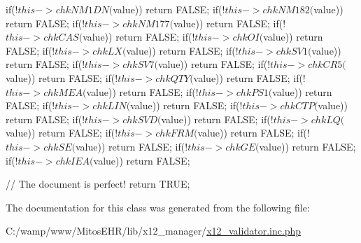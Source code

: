 \begin{DoxyCode}
{{                        if(!$this->chkNM1DN($value)){ return FALSE; }
                        if(!$this->chkNM182($value)){ return FALSE; }
                        if(!$this->chkNM177($value)){ return FALSE; }
                        if(!$this->chkCAS($value)){ return FALSE; }
                        if(!$this->chkOI($value)){ return FALSE; }
                        if(!$this->chkLX($value)){ return FALSE; }
                        if(!$this->chkSV1($value)){ return FALSE; }
                        if(!$this->chkSV7($value)){ return FALSE; }
                        if(!$this->chkCR5($value)){ return FALSE; }
                        if(!$this->chkQTY($value)){ return FALSE; }
                        if(!$this->chkMEA($value)){ return FALSE; }
                        if(!$this->chkPS1($value)){ return FALSE; }
                        if(!$this->chkLIN($value)){ return FALSE; }
                        if(!$this->chkCTP($value)){ return FALSE; }
                        if(!$this->chkSVD($value)){ return FALSE; }
                        if(!$this->chkLQ($value)){ return FALSE; }
                        if(!$this->chkFRM($value)){ return FALSE; }
                        if(!$this->chkSE($value)){ return FALSE; }
                        if(!$this->chkGE($value)){ return FALSE; }
                        if(!$this->chkIEA($value)){ return FALSE; }
                }               
                
                // The document is perfect!
                return TRUE;
        }
\end{DoxyCode}


\-The documentation for this class was generated from the following file\-:\begin{DoxyCompactItemize}
\item 
\-C\-:/wamp/www/\-Mitos\-E\-H\-R/lib/x12\-\_\-manager/\hyperlink{x12__validator_8inc_8php}{x12\-\_\-validator.\-inc.\-php}\end{DoxyCompactItemize}
